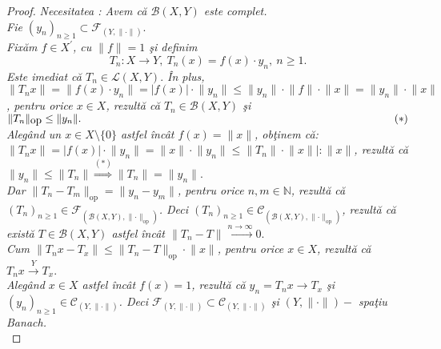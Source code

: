 \documentclass[ a4paper, 12pt]{report}
\theoremstyle{definition}
\theoremstyle{remark}
\numberwithin{equation}{section}
\begin{document}
\begin{proof}
\it{Necesitatea} :
Avem c\u a $\mathcal{B}(X,Y)$ este complet.\\
Fie $(y_n)_{n \geq 1} \subset \mathcal{F}_{(Y,\lVert \cdot \rVert)}.$\\
Fix\u am $f \in X^{'}$, cu $\lVert f \rVert = 1$ \c si definim
\[ T_n : X \rightarrow Y,\  T_n(x) = f(x) \cdot y_n,\  n \geq 1.\]
Este imediat c\u a $T_n \in \mathcal{L}(X,Y).$ \^In plus, $\lVert T_n x \rVert = \lVert f(x) \cdot y_n  \rVert = \lvert f(x) \rvert \cdot \lVert y_n \rVert \leq \lVert y_n \rVert \cdot \lVert f \rVert \cdot \lVert x \rVert = \lVert y_n  \rVert \cdot \lVert x \rVert$, pentru orice $x \in X$, rezult\u a c\u a $T_n \in \mathcal{B}(X,Y)$ \c si
 $\lVert T_n \rVert_{\mbox{op}} \leq \lVert y_n \rVert. \hspace{10.3cm} (\ast)$\\
Aleg\^and un $x \in X \setminus\{0\}$ astfel \^inc\^at $f(x) = \lVert x \rVert$, ob\c tinem c\u a: $\lVert T_n x \rVert = \lvert f(x) \rvert \cdot \lVert y_n \rVert = \lVert x \rVert \cdot \lVert y_n \rVert \leq \lVert T_n  \rVert \cdot \lVert x \rVert \Big| :\lVert x \rVert$, rezult\u a c\u a $\lVert y_n \rVert \leq \lVert T_n \rVert \stackrel{(\ast)}{\Rightarrow}\lVert T_n \rVert = \lVert y_n \rVert.$\\
Dar $\lVert T_n -T_m  \rVert_{\mbox{op}} = \lVert y_n - y_m \rVert$, pentru orice $n,m \in \mathbb{N}$, rezult\u a c\u a $(T_n)_{n \geq 1} \in \mathcal{F}_{\left(\mathcal{B}(X,Y), \lVert \cdot  \rVert_{\mbox{op}}\right)}$. Deci $(T_n)_{n \geq 1} \in \mathcal{C}_{\left( \mathcal{B}(X,Y), \lVert \cdot  \rVert_{\mbox{op}} \right)}$, rezult\u a c\u a exist\u a $T \in \mathcal{B}(X,Y) $ astfel \^inc\^at $\lVert T_n - T  \rVert \stackrel{n \rightarrow \infty}{\longrightarrow} 0.$\\
Cum $\lVert T_n x - T_x \rVert \leq \lVert T_n - T  \rVert_{\mbox{op}} \cdot \lVert x \rVert$, pentru orice $x \in X$, rezult\u a c\u a $T_n x \stackrel{Y}{\longrightarrow} T_x.$\\




Aleg\^and $x \in X$ astfel \^inc\^at $f(x) = 1$, rezult\u a c\u a $y_n = T_n x \longrightarrow T_x$ \c si $(y_n)_{n \geq 1} \in \mathcal{C}_{(Y,\lVert \cdot \rVert)}$. Deci $\mathcal{F}_{(Y,\lVert \cdot \rVert)} \subset \mathcal{C}_{(Y,\lVert \cdot \rVert)}$ \c si $(Y,\lVert \cdot \rVert)-$ spa\c tiu Banach.\\


\end{proof}
\end{document}
